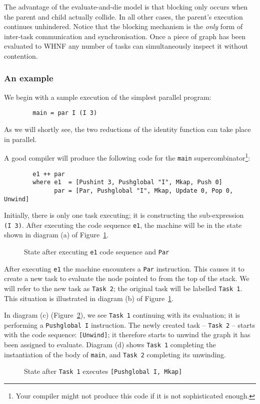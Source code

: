 The advantage of the evaluate-and-die model is that blocking only
occurs when the parent and child actually collide. In all other cases,
the parent's execution continues unhindered. Notice that the blocking
mechanism is the {\em only\/} form of inter-task communication and
synchronisation. Once a piece of graph has been evaluated to WHNF any
number of tasks can simultaneously inspect it without contention.

\subsubsection{An example}

We begin with a sample execution of the simplest parallel program:
\begin{verbatim}
        main = par I (I 3)
\end{verbatim}
As we will shortly see, the two reductions of the identity function
can take place in parallel.

A good compiler will produce the following code for the \mbox{\tt main}
supercombinator\footnote{Your compiler might not produce this code if
it is not sophisticated enough.}:
\begin{verbatim}
        e1 ++ par
        where e1  = [Pushint 3, Pushglobal "I", Mkap, Push 0]
              par = [Par, Pushglobal "I", Mkap, Update 0, Pop 0, Unwind]
\end{verbatim}
Initially, there is only one task executing; it is constructing the
sub-expression \mbox{\tt (I\ 3)}. After executing the code sequence \mbox{\tt e1}, the
machine will be in the state shown in diagram (a) of
Figure~\ref{pgm:fg:1ex1}.
\begin{figure}

\caption{State after executing \mbox{\tt e1} code sequence and \mbox{\tt Par}}\label{pgm:fg:1ex1}
\end{figure}

After executing \mbox{\tt e1} the machine encounters a \mbox{\tt Par} instruction. This
causes it to create a new task to evaluate the node pointed to from
the top of the stack. We will refer to the new task as \mbox{\tt Task\ 2}; the
original task will be labelled \mbox{\tt Task\ 1}. This situation is illustrated
in diagram (b) of Figure~\ref{pgm:fg:1ex1}.

In diagram (c) (Figure~\ref{pgm:fg:1ex2}), we see \mbox{\tt Task\ 1}
continuing with its evaluation; it is performing a \mbox{\tt Pushglobal\ I}
instruction. The newly created task -- \mbox{\tt Task\ 2} -- starts with the
code sequence: \mbox{\tt [Unwind]}; it therefore starts to unwind the graph it
has been assigned to evaluate. Diagram (d) shows \mbox{\tt Task\ 1}
completing the instantiation of the body of \mbox{\tt main}, and \mbox{\tt Task\ 2}
completing its unwinding.
\begin{figure}

\caption{State after \mbox{\tt Task\ 1} executes \mbox{\tt [Pushglobal\ I,\ Mkap]}}
\label{pgm:fg:1ex2}
\end{figure}

